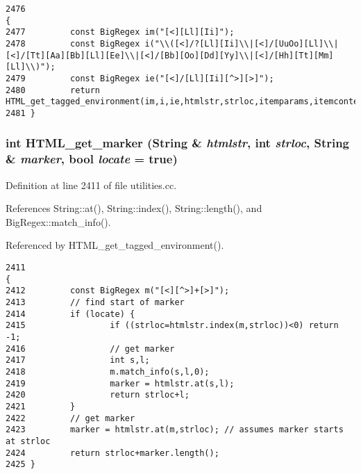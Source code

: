 \footnotesize\begin{verbatim}2476                                                                                                                         {
2477         const BigRegex im("[<][Ll][Ii]");
2478         const BigRegex i("\\([<]/?[Ll][Ii]\\|[<]/[UuOo][Ll]\\|[<]/[Tt][Aa][Bb][Ll][Ee]\\|[<]/[Bb][Oo][Dd][Yy]\\|[<]/[Hh][Tt][Mm][Ll]\\)");
2479         const BigRegex ie("[<]/[Ll][Ii][^>][>]");
2480         return HTML_get_tagged_environment(im,i,ie,htmlstr,strloc,itemparams,itemcontent,itemstart);
2481 }
\end{verbatim}\normalsize 
{}
\subsubsection{\setlength{\rightskip}{0pt plus 5cm}int HTML\_\-get\_\-marker ({\bf String} \& {\em htmlstr}, int {\em strloc}, {\bf String} \& {\em marker}, bool {\em locate} = {\bf true})}\label{utilities_8cc_a51}




Definition at line 2411 of file utilities.cc.

References String::at(), String::index(), String::length(), and Big\-Regex::match\_\-info().

Referenced by HTML\_\-get\_\-tagged\_\-environment().



\footnotesize\begin{verbatim}2411                                                                                       {
2412         const BigRegex m("[<][^>]+[>]");
2413         // find start of marker
2414         if (locate) {
2415                 if ((strloc=htmlstr.index(m,strloc))<0) return -1;
2416                 // get marker
2417                 int s,l;
2418                 m.match_info(s,l,0);
2419                 marker = htmlstr.at(s,l);
2420                 return strloc+l;
2421         }
2422         // get marker
2423         marker = htmlstr.at(m,strloc); // assumes marker starts at strloc
2424         return strloc+marker.length();
2425 }
\end{verbatim}\normalsize 
{}
